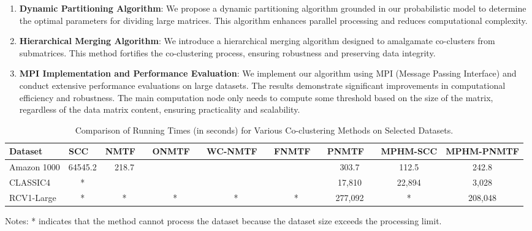 \documentclass[journal]{IEEEtran}
\renewcommand{\cite}[1]{~\autocite{#1}}
\begin{document}
\begin{enumerate}
  \item \textbf{Dynamic Partitioning Algorithm}: We propose a dynamic partitioning algorithm grounded in our probabilistic model to determine the optimal parameters for dividing large matrices. This algorithm enhances parallel processing and reduces computational complexity.

  \item \textbf{Hierarchical Merging Algorithm}: We introduce a hierarchical merging algorithm designed to amalgamate co-clusters from submatrices. This method fortifies the co-clustering process, ensuring robustness and preserving data integrity.

  \item \textbf{MPI Implementation and Performance Evaluation}: We implement our algorithm using MPI (Message Passing Interface) and conduct extensive performance evaluations on large datasets. The results demonstrate significant improvements in computational efficiency and robustness. The main computation node only needs to compute some threshold based on the size of the matrix, regardless of the data matrix content, ensuring practicality and scalability.
\end{enumerate}

\begin{table*}[htbp]
  \centering
  \caption{Comparison of Running Times (in seconds) for Various Co-clustering Methods on Selected Datasets.}
  \label{tab:running-time}
  \begin{tabular}{@{} l cccccccc @{}}
    \toprule
    Dataset     & SCC \cite{dhillon2001CoclusteringDocumentsWords}
                & NMTF \cite{long2005CoclusteringBlockValue}
                & ONMTF \cite{ding2006OrthogonalNonnegativeMatrix}
                & WC-NMTF \cite{salah2018WordCooccurrenceRegularized}
                & FNMTF \cite{kim2011FastNonnegativeMatrix}
                & PNMTF \cite{chen2023ParallelNonNegativeMatrix}      & \textbf{MPHM-SCC} & \textbf{MPHM-PNMTF}                                      \\
    \midrule
    Amazon 1000 & 64545.2                                             & 218.7             &                     &   &   & 303.7   & 112.5  & 242.8   \\
    CLASSIC4    & *                                                   &                   &                     &   &   & 17,810  & 22,894 & 3,028   \\
    RCV1-Large  & *                                                   & *                 & *                   & * & * & 277,092 & *      & 208,048 \\
    \bottomrule
  \end{tabular}
  \begin{tablenotes}
    \small
    \item Notes: * indicates that the method cannot process the dataset because the dataset size exceeds the processing limit.
  \end{tablenotes}
\end{table*}
\end{document}
